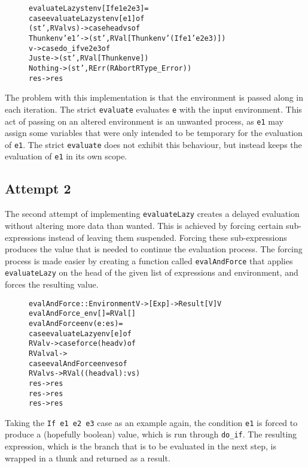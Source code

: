 \begin{figure}[H]
\begin{alltt}
  evaluateLazy st env [If e1 e2 e3]   =
    case evaluateLazy st env [e1] of
      (st', RVal vs)   -> case head vs of
        Thunk env' e1' -> (st', RVal [Thunk env' (If e1' e2 e3)])
        v              -> case do_if v e2 e3 of
          Just e  -> (st', RVal [Thunk env e])
          Nothing -> (st', RErr (RAbort RType_Error))
      res -> res
\end{alltt}
\end{figure}

The problem with this implementation is that the environment is passed along
in each iteration. The strict \texttt{evaluate} evaluates \texttt{e} with
the input environment. This act of passing on an altered environment is an
unwanted process, as \texttt{e1} may assign some variables that were only
intended to be temporary for the evaluation of \texttt{e1}. The strict
\texttt{evaluate} does not exhibit this behaviour, but instead keeps the
evaluation of \texttt{e1} in its own scope.

\subsection{Attempt 2}
\label{lazySem:att2}
The second attempt of implementing \texttt{evaluateLazy} creates a
delayed evaluation without altering more data than wanted. This
is achieved by forcing certain sub-expressions instead of leaving them
suspended. Forcing these sub-expressions produces the value that is needed
to continue the evaluation process. The forcing process is made easier by
creating a function called \texttt{evalAndForce} that applies
\texttt{evaluateLazy} on the head of the given list of expressions and
environment, and forces the resulting value.

\begin{figure}[H]
\begin{alltt}
  evalAndForce :: Environment V -> [Exp] -> Result [V] V
  evalAndForce _env []    = RVal []
  evalAndForce env (e:es) =
    case evaluateLazy env [e] of
      RVal v -> case force (head v) of
        RVal val ->
          case evalAndForce env es of
            RVal vs -> RVal ((head val):vs)
            res -> res
        res -> res
      res -> res
\end{alltt}
\end{figure}

Taking the \texttt{If e1 e2 e3} case as an example again, the condition
\texttt{e1} is forced to produce a (hopefully boolean) value, which is run
through \texttt{do\_if}. The resulting expression, which is the branch that is
to be evaluated in the next step, is wrapped in a thunk and returned as a
result.

